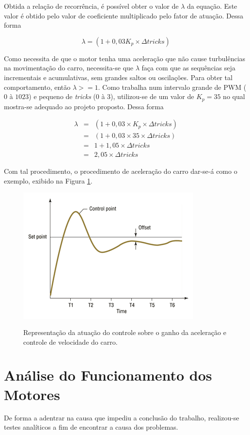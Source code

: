 	Obtida a relação de recorrência, é possível obter o valor de $ \lambda $ da equação. Este valor é obtido pelo valor de coeficiente multiplicado pelo fator de atuação. Dessa forma 

	\begin{equation}
		\lambda = (1 + 0,03 K_p \times \Delta tricks) \label{eq:lambda}
	\end{equation}

	Como necessita de que o motor tenha uma aceleração que não cause turbulências na movimentação do carro, necessita-se que $ \lambda $ faça com que as sequências seja incrementais e acumulativas, sem grandes saltos ou oscilações. Para obter tal comportamento, então $\lambda >=1$. Como trabalha num intervalo grande de PWM ($0$ à $1023$) e pequeno de \textit{tricks} (0 à 3), utilizou-se de um valor de $ K_p = 35 $ no qual mostra-se adequado ao projeto proposto. Dessa forma

	\begin{eqnarray}
		\lambda & = & (1 + 0,03 \times K_p \times \Delta tricks) \label{eq:lambda} \\
		~       & = & (1 + 0,03 \times 35 \times \Delta tricks) \nonumber  \\
		~       & = & 1 + 1,05 \times \Delta tricks \nonumber \\
		~       & = & 2,05 \times \Delta tricks 
	\end{eqnarray}

	Com tal procedimento, o procedimento de aceleração do carro dar-se-á como o exemplo, exibido na Figura \ref{fig:graph}.

	\begin{figure}[ht]
		\centering
		\includegraphics[width=0.5\linewidth]{img/recorrencia-graph.png}
		\label{fig:graph}
		\caption{Representação da atuação do controle sobre o ganho da aceleração e controle de velocidade do carro.}
	\end{figure}



\section{Análise do Funcionamento dos Motores} \label{sec:analitico}
	De forma a adentrar na causa que impediu a conclusão do trabalho, realizou-se testes analíticos a fim de encontrar a causa dos problemas.

